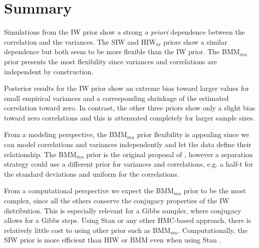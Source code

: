 \documentclass[12pt]{article}
\begin{document}
\section{Summary \label{sec:summary}} 

Simulations from the IW prior show a strong \emph{a priori} dependence between the correlation and the variances. The SIW and HIW$_{ht}$ priors show a similar dependence but both seem to be more flexible than the IW prior. The BMM$_{mu}$ prior presents the most flexibility since variances and correlations are independent by construction.

Posterior results for the IW prior show an extreme bias toward larger values for small empirical variances and a corresponding shrinkage of the estimated correlation toward zero. In contrast, the other three priors show only a slight bias toward zero correlations and this is attenuated completely for larger sample sizes.

From a modeling perspective, the BMM$_{mu}$ prior flexibility is appealing since we can model correlations and variances independently and let the data define their relationship.  The BMM$_{mu}$ prior is the original proposal of \cite{barnard2000}, however a separation strategy could use a different prior for variances and correlations, e.g. a half-t for the standard deviations and uniform for the correlations. 

From a computational perspective we expect the BMM$_{mu}$ prior to be the most complex, since all the others conserve the conjugacy properties of the IW distribution. This is especially relevant for a Gibbs sampler, where conjugacy allows for a Gibbs steps. Using Stan or any other HMC-based approach, there is relatively little cost to using other prior such as BMM$_{mu}$. 
Computationally, the SIW prior is more efficient than HIW or BMM even when using Stan \citep{CCalvarez}. 
\end{document}
